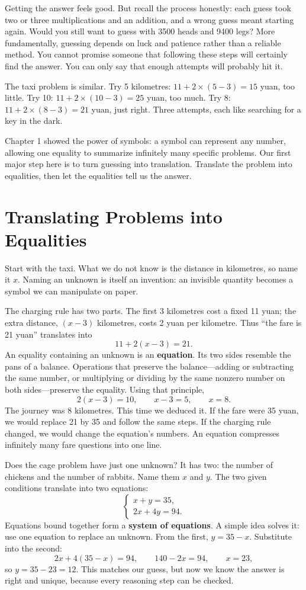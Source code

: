 Getting the answer feels good. But recall the process honestly: each guess took two or three multiplications and an addition, and a wrong guess meant starting again. Would you still want to guess with 3500 heads and 9400 legs? More fundamentally, guessing depends on luck and patience rather than a reliable method. You cannot promise someone that following these steps will certainly find the answer. You can only say that enough attempts will probably hit it.

The taxi problem is similar. Try 5 kilometres: $11 + 2 \times (5-3) = 15$ yuan, too little. Try 10: $11 + 2 \times (10-3) = 25$ yuan, too much. Try 8: $11 + 2 \times (8-3) = 21$ yuan, just right. Three attempts, each like searching for a key in the dark.

Chapter 1 showed the power of symbols: a symbol can represent any number, allowing one equality to summarize infinitely many specific problems. Our first major step here is to turn guessing into translation. Translate the problem into equalities, then let the equalities tell us the answer.

\section{Translating Problems into Equalities}

Start with the taxi. What we do not know is the distance in kilometres, so name it $x$. Naming an unknown is itself an invention: an invisible quantity becomes a symbol we can manipulate on paper.

The charging rule has two parts. The first 3 kilometres cost a fixed 11 yuan; the extra distance, $(x - 3)$ kilometres, costs 2 yuan per kilometre. Thus ``the fare is 21 yuan'' translates into
\[
11 + 2(x - 3) = 21.
\]
An equality containing an unknown is an \textbf{equation}. Its two sides resemble the pans of a balance. Operations that preserve the balance---adding or subtracting the same number, or multiplying or dividing by the same nonzero number on both sides---preserve the equality. Using that principle,
\[
2(x - 3) = 10,\qquad x - 3 = 5,\qquad x = 8.
\]
The journey was 8 kilometres. This time we deduced it. If the fare were 35 yuan, we would replace 21 by 35 and follow the same steps. If the charging rule changed, we would change the equation's numbers. An equation compresses infinitely many fare questions into one line.

Does the cage problem have just one unknown? It has two: the number of chickens and the number of rabbits. Name them $x$ and $y$. The two given conditions translate into two equations:
\[
\begin{cases}
x + y = 35,\\
2x + 4y = 94.
\end{cases}
\]
Equations bound together form a \textbf{system of equations}. A simple idea solves it: use one equation to replace an unknown. From the first, $y = 35 - x$. Substitute into the second:
\[
2x + 4(35 - x) = 94,\qquad 140 - 2x = 94,\qquad x = 23,
\]
so $y = 35 - 23 = 12$. This matches our guess, but now we know the answer is right and unique, because every reasoning step can be checked.

